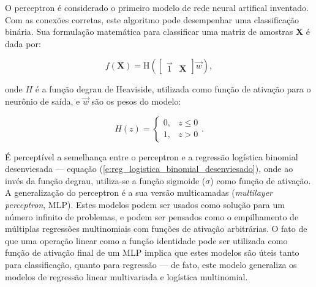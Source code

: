       O perceptron  é considerado o primeiro modelo de rede neural artifical inventado. Com as conexões corretas, este algoritmo pode desempenhar uma classificação binária. Sua formulação matemática para classificar uma matriz de amostras $\boldsymbol{X}$ é dada por:

    \begin{equation} \label{e:perceptron_original}
      f(\boldsymbol{X}) = \text{H}\left( \begin{bmatrix} \vec{1} & \boldsymbol{X}\end{bmatrix} \vec{w} \right)
      ,
    \end{equation}

    \noindent onde $H$ é a função degrau de Heaviside, utilizada como função de ativação para o neurônio de saída, e $\vec{w}$ são os pesos do modelo:

    \begin{equation} \label{e:heaviside}
      H(z) = \begin{cases}
        0, & z \le 0 \\
        1, & z > 0
      \end{cases}
      .
    \end{equation}

    É perceptível a semelhança entre o perceptron e a regressão logística binomial desenviesada --- equação (\ref{e:reg_logistica_binomial_desenviesado}), onde ao invés da função degrau, utiliza-se a função sigmoide ($\sigma$) como função de ativação. A generalização do perceptron é a sua versão multicamadas (\textit{multilayer perceptron}, MLP). Estes modelos podem ser usados como solução para um número infinito de problemas, e podem ser pensados como o empilhamento de múltiplas regressões multinomiais com funções de ativação arbitrárias. O fato de que uma operação linear como a função identidade pode ser utilizada como função de ativação final de um MLP implica que estes modelos são úteis tanto para classificação, quanto para regressão  --- de fato, este modelo generaliza os modelos de regressão linear multivariada e logística multinomial.

